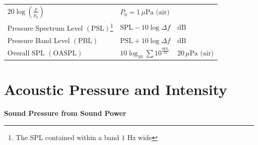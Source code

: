\documentclass[
]{book}
\begin{document}
\begin{longtable}[]{@{}lll@{}}
\begin{minipage}[t]{0.26\columnwidth}
\(20 \log \left( \frac{p}{p_0} \right)\)\strut
\end{minipage} & \begin{minipage}[t]{0.26\columnwidth}\raggedright
\(P_0 = 1\,\mu\text{Pa (air)}\)\strut
\end{minipage}\tabularnewline
\begin{minipage}[t]{0.39\columnwidth}\raggedright
Pressure Spectrum Level \(\left( \mathrm{PSL} \right)\)\footnote{The \(\mathrm{SPL}\) contained within a band \(1 \text{ Hz}\) wide}\strut
\end{minipage} & \begin{minipage}[t]{0.26\columnwidth}\raggedright
\(\mathrm{SPL} - 10 \log \Delta f\)\strut
\end{minipage} & \begin{minipage}[t]{0.26\columnwidth}\raggedright
\(\text{dB}\)\strut
\end{minipage}\tabularnewline
\begin{minipage}[t]{0.39\columnwidth}\raggedright
Pressure Band Level \(\left( \mathrm{PBL} \right)\)\strut
\end{minipage} & \begin{minipage}[t]{0.26\columnwidth}\raggedright
\(\mathrm{PSL} + 10 \log \Delta f\)\strut
\end{minipage} & \begin{minipage}[t]{0.26\columnwidth}\raggedright
\(\text{dB}\)\strut
\end{minipage}\tabularnewline
\begin{minipage}[t]{0.39\columnwidth}\raggedright
Overall SPL \(\left( \mathrm{OASPL} \right)\)\strut
\end{minipage} & \begin{minipage}[t]{0.26\columnwidth}\raggedright
\(10 \log_{10} \sum 10^{\frac{\mathrm{SPL}}{10}}\)\strut
\end{minipage} & \begin{minipage}[t]{0.26\columnwidth}\raggedright
\(20\,\mu\text{Pa (air)}\)\strut
\end{minipage}\tabularnewline
\bottomrule
\end{longtable}

\hypertarget{acoustic-pressure-and-intensity}{%
\section{Acoustic Pressure and Intensity}\label{acoustic-pressure-and-intensity}}

\textbf{Sound Pressure from Sound Power}
\end{document}

